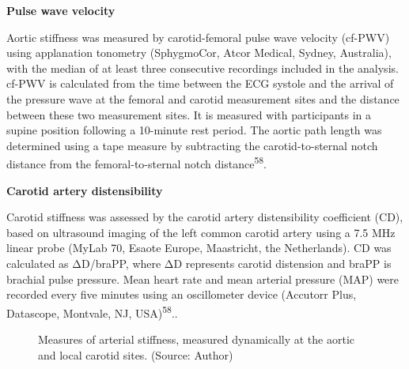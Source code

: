 \documentclass[
  a4paper,
  headsepline=true,
  open=any]{scrbook}
\begin{document}
\textbf{Pulse wave velocity}

Aortic stiffness was measured by carotid-femoral pulse wave velocity
(cf-PWV) using applanation tonometry (SphygmoCor, Atcor Medical, Sydney,
Australia), with the median of at least three consecutive recordings
included in the analysis. cf-PWV is calculated from the time between the
ECG systole and the arrival of the pressure wave at the femoral and
carotid measurement sites and the distance between these two measurement
sites. It is measured with participants in a supine position following a
10-minute rest period. The aortic path length was determined using a
tape measure by subtracting the carotid-to-sternal notch distance from
the femoral-to-sternal notch distance\textsuperscript{58}.

\textbf{Carotid artery distensibility}

Carotid stiffness was assessed by the carotid artery distensibility
coefficient (CD), based on ultrasound imaging of the left common carotid
artery using a 7.5 MHz linear probe (MyLab 70, Esaote Europe,
Maastricht, the Netherlands). CD was calculated as ΔD/braPP, where ΔD
represents carotid distension and braPP is brachial pulse pressure. Mean
heart rate and mean arterial pressure (MAP) were recorded every five
minutes using an oscillometer device (Accutorr Plus, Datascope,
Montvale, NJ, USA)\textsuperscript{58}..

\begin{figure}

\begin{minipage}[t]{\linewidth}

{\centering 


\caption{Measures of arterial stiffness, measured dynamically at the
aortic and local carotid sites. (Source: Author)}

}

\end{minipage}%

\end{figure}
\end{document}
